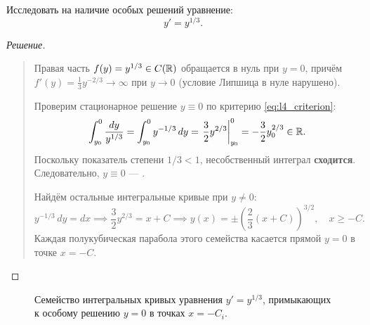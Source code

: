 \begin{example}
    Исследовать на наличие особых решений уравнение:
    \begin{equation} \label{eq:l4_ex1_ode}
        y' = y^{1/3}. \tag{3}
    \end{equation}

    \begin{proof}[Решение]~\\
        \begin{quote}
            Правая часть $f(y) = y^{1/3} \in C(\mathbb{R})$ обращается в нуль при
            $y = 0$, причём $f'(y) = \frac{1}{3} y^{-2/3} \to \infty$ при
            $y \to 0$ (условие Липшица в нуле нарушено).

            Проверим стационарное решение $y \equiv 0$ по критерию
            \eqref{eq:l4_criterion}:
            \[
                \int_{y_0}^{0} \frac{dy}{y^{1/3}} =
                \int_{y_0}^{0} y^{-1/3} \, dy =
                \left. \frac{3}{2} y^{2/3} \right|_{y_0}^{0} =
                -\frac{3}{2} y_0^{2/3} \in \mathbb{R}.
            \]
            Поскольку показатель степени $1/3 < 1$, несобственный интеграл
            \textbf{сходится}. Следовательно, $y \equiv 0$ — .

            Найдём остальные интегральные кривые при $y \neq 0$:
            \[
                y^{-1/3} \, dy = dx \implies \frac{3}{2} y^{2/3} = x + C
                \implies y(x) = \pm \left(\frac{2}{3}(x + C)\right)^{3/2},
                \quad x \ge -C.
            \]
            Каждая полукубическая парабола этого семейства касается прямой
            $y = 0$ в точке $x = -C$.
        \end{quote}
    \end{proof}
\end{example}

\begin{figure}[H]
    \centering
    \caption{Семейство интегральных кривых уравнения $y' = y^{1/3}$,
    примыкающих к особому решению $y = 0$ в точках $x = -C_i$.}
\end{figure}

